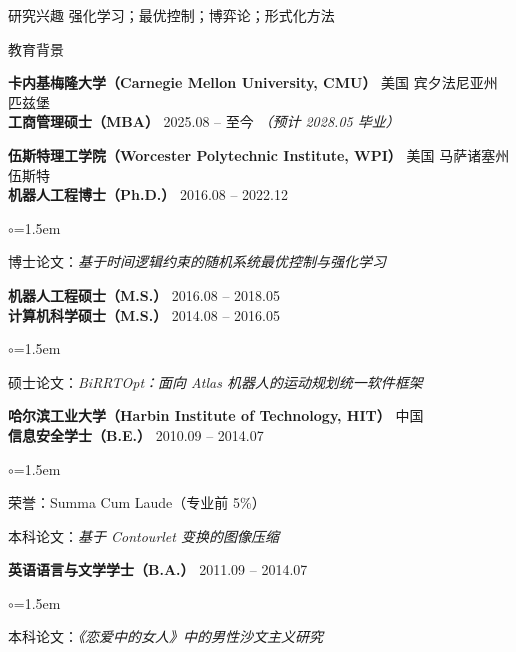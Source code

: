 \documentclass{resume}
\begin{document}


\begin{rSection}{研究兴趣}
强化学习；最优控制；博弈论；形式化方法
\end{rSection}

\begin{rSection}{教育背景}

{\bf 卡内基梅隆大学（Carnegie Mellon University, CMU）} \hfill 美国 宾夕法尼亚州 匹兹堡 \\
{\bf 工商管理硕士（MBA）} \hfill 2025.08 -- 至今 {\em（预计 2028.05 毕业）}

{\bf 伍斯特理工学院（Worcester Polytechnic Institute, WPI）} \hfill 美国 马萨诸塞州 伍斯特 \\
{\bf 机器人工程博士（Ph.D.）} \hfill 2016.08 -- 2022.12
\begin{list}{$\circ$}{\leftmargin=1.5em}
\item 博士论文：\textit{基于时间逻辑约束的随机系统最优控制与强化学习}
\end{list}

{\bf 机器人工程硕士（M.S.）} \hfill 2016.08 -- 2018.05 \\

{\bf 计算机科学硕士（M.S.）} \hfill 2014.08 -- 2016.05
\begin{list}{$\circ$}{\leftmargin=1.5em}
\item 硕士论文：\textit{BiRRTOpt：面向 Atlas 机器人的运动规划统一软件框架}
\end{list}

{\bf 哈尔滨工业大学（Harbin Institute of Technology, HIT）} \hfill 中国 \\
{\bf 信息安全学士（B.E.）} \hfill 2010.09 -- 2014.07
\begin{list}{$\circ$}{\leftmargin=1.5em}
\item 荣誉：Summa Cum Laude（专业前 5\%）
\item 本科论文：\textit{基于 Contourlet 变换的图像压缩}
\end{list}

{\bf 英语语言与文学学士（B.A.）} \hfill 2011.09 -- 2014.07
\begin{list}{$\circ$}{\leftmargin=1.5em}
\item 本科论文：\textit{《恋爱中的女人》中的男性沙文主义研究}
\end{list}

\end{rSection}
\end{document}
